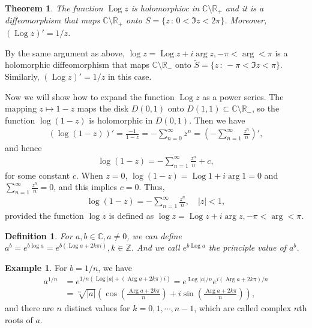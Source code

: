 \documentclass[11pt]{book}
\newtheorem{definition}{Definition}[chapter]
\newtheorem{theorem}{Theorem}[chapter]
\theoremstyle{definition}
\newtheorem{example}{Example}[chapter]
\numberwithin{equation}{chapter}
\begin{document}
\medskip

\begin{theorem}
The function $\operatorname{Log} z$ is holomorphioc in $\mathbb{C} \setminus \mathbb{R}_+$ and it is a diffeomorphism that maps $\mathbb{C} \setminus \mathbb{R}_+$ onto $S = \{z \,:\, 0 < \Im z < 2\pi\}$. Moreover, $\left(\operatorname{Log} z\right)' = 1/z$.
\end{theorem}

\medskip

By the same argument as above, $\log z = \operatorname{Log} z + i \arg z, -\pi < \arg < \pi$ is a holomorphic diffeomorphism that maps $\mathbb{C} \setminus \mathbb{R}_-$ onto $\widetilde{S} = \{z \,:\, -\pi < \Im z < \pi\}$. Similarly, $\left(\operatorname{Log} z\right)' = 1/z$ in this case.

Now we will show how to expand the function $\operatorname{Log} z$ as a power series. The mapping $z \mapsto 1 - z$ maps the disk $D(0,1)$ onto $D(1,1) \subset \mathbb{C} \setminus \mathbb{R}_-$, so the function $\log (1 - z)$ is holomorphic in $D(0,1)$. Then we have
\begin{align*}
    \left(\log (1 - z)\right)' = \frac{-1}{1 - z} = - \sum^\infty_{n=0} z^n = \left(- \sum^\infty_{n=1} \frac{z^n}{n}\right)',
\end{align*}
and hence 
\begin{align*}
    \log (1 - z) = - \sum^\infty_{n=1} \frac{z^n}{n} + c,
\end{align*}
for some constant $c$. When $z = 0$, $\log (1 - z) = \operatorname{Log} 1 + i \arg 1 = 0$ and $\sum^\infty_{n=1} \frac{z^n}{n} = 0$, and this implies $c = 0$. Thus, 
\begin{align*}
    \log (1 - z) = - \sum^\infty_{n=1} \frac{z^n}{n}, \quad \left|z\right| < 1,
\end{align*}
provided the function $\log z$ is defined as $\log z = \operatorname{Log} z + i \arg z, -\pi < \arg < \pi$. 

\medskip


\begin{definition}
For $a, b \in \mathbb{C}, a \neq 0$, we can define $a^b = e^{b \log a} = e^{b(\operatorname{Log} a + 2k\pi i)}, k\in \mathbb{Z}$. And we call $e^{b\operatorname{Log} a}$ the principle value of $a^b$. 
\end{definition}

\medskip

\begin{example}
For $b = 1/n$, we have 
\begin{align*}
    a^{1/n} & = e^{1/n(\operatorname{Log}\left|a\right| + (\operatorname{Arg} a + 2k\pi)i)} = e^{\operatorname{Log}\left|a\right|/n} e^{i(\operatorname{Arg} a + 2k\pi)/n} \\
    & = \sqrt[n]{\left|a\right|} \left(\cos\left(\frac{\operatorname{Arg} a + 2k\pi}{n}\right) + i \sin\left(\frac{\operatorname{Arg} a + 2k\pi}{n}\right)\right),
\end{align*}
and there are $n$ distinct values for $k = 0,1,\cdots,n-1$, which are called complex $n$th roots of $a$.
\end{example}
\end{document}
